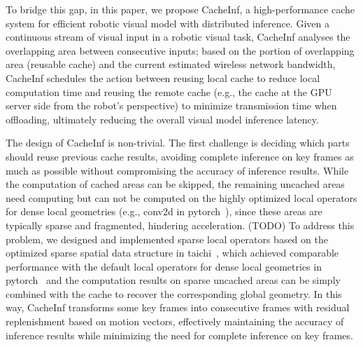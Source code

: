 
To bridge this gap, in this paper, we propose CacheInf, a high-performance cache system for efficient robotic visual model with distributed inference.
Given a continuous stream of visual input in a robotic visual task, CacheInf analyses the overlapping area between consecutive inputs;
based on the portion of overlapping area (reusable cache) and the current estimated wireless network bandwidth, CacheInf schedules the action between reusing local cache to reduce local computation time and reusing the remote cache (e.g., the cache at the GPU server side from the robot's perspective) to minimize transmission time when offloading, ultimately reducing the overall visual model inference latency.

The design of CacheInf is non-trivial.
The first challenge is deciding which parts should reuse previous cache results, avoiding complete inference on key frames as much as possible without compromising the accuracy of inference results. 
While the computation of cached areas can be skipped, the remaining uncached areas need computing but can not be computed on the highly optimized local operators for dense local geometries (e.g., conv2d in pytorch~\cite{paszke2017automatic}), since these areas are typically sparse and fragmented, hindering acceleration.
(TODO) To address this problem, we designed and implemented sparse local operators based on the optimized sparse spatial data structure in taichi~\cite{taichi}, which achieved comparable performance with the default local operators for dense local geometries in pytorch~\cite{paszke2017automatic} and the computation results on sparse uncached areas can be simply combined with the cache to recover the corresponding global geometry.
In this way, CacheInf transforms some key frames into consecutive frames with residual replenishment based on motion vectors, effectively maintaining the accuracy of inference results while minimizing the need for complete inference on key frames.

